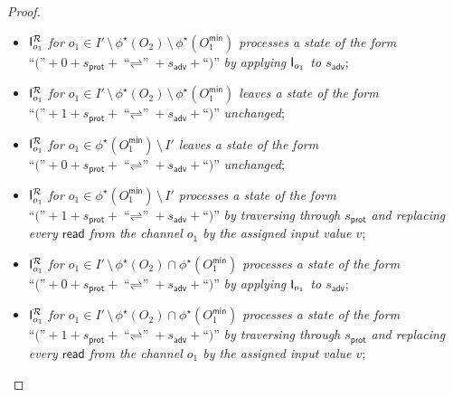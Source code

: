 \begin{proof}
\begin{itemize}
\item $\mathsf{I}_{o_1}^\mathcal{R}$ \emph{for $o_1 \in I' \, \setminus \, \phi^\star(O_2) \, \setminus \, \phi^\star(O_1^\mathsf{min})$ processes a state of the form} $\textsf{``(''} + 0 + s_\mathsf{prot} + \textsf{``$\rightleftharpoons$''} + s_\mathsf{adv} + \textsf{``)''}$ \emph{by applying $\mathsf{I}_{o_1}$ to $s_\mathsf{adv}$};

\item $\mathsf{I}_{o_1}^\mathcal{R}$ \emph{for $o_1 \in I' \, \setminus \, \phi^\star(O_2) \, \setminus \, \phi^\star(O_1^\mathsf{min})$ leaves a state of the form} $\textsf{``(''} + 1 + s_\mathsf{prot} + \textsf{``$\rightleftharpoons$''} + s_\mathsf{adv} + \textsf{``)''}$ \emph{unchanged};

\item $\mathsf{I}_{o_1}^\mathcal{R}$ \emph{for $o_1 \in \phi^\star(O_1^\mathsf{min}) \, \setminus \, I'$ leaves a state of the form} $\textsf{``(''} + 0 + s_\mathsf{prot} + \textsf{``$\rightleftharpoons$''} + s_\mathsf{adv} + \textsf{``)''}$ \emph{unchanged};

\item $\mathsf{I}_{o_1}^\mathcal{R}$ \emph{for $o_1 \in \phi^\star(O_1^\mathsf{min}) \, \setminus \, I'$ processes a state of the form} $\textsf{``(''} + 1 + s_\mathsf{prot} + \textsf{``$\rightleftharpoons$''} + s_\mathsf{adv} + \textsf{``)''}$ \emph{by traversing through $s_\mathsf{prot}$ and replacing every $\mathsf{read}$ from the channel $o_1$ by the assigned input value $v$};

\item $\mathsf{I}_{o_1}^\mathcal{R}$ \emph{for $o_1 \in I' \, \setminus \, \phi^\star(O_2) \cap \phi^\star(O_1^\mathsf{min})$ processes a state of the form} $\textsf{``(''} + 0 + s_\mathsf{prot} + \textsf{``$\rightleftharpoons$''} + s_\mathsf{adv} + \textsf{``)''}$ \emph{by applying $\mathsf{I}_{o_1}$ to $s_\mathsf{adv}$};

\item $\mathsf{I}_{o_1}^\mathcal{R}$ \emph{for $o_1 \in I' \, \setminus \, \phi^\star(O_2) \cap \phi^\star(O_1^\mathsf{min})$ processes a state of the form} $\textsf{``(''} + 1 + s_\mathsf{prot} + \textsf{``$\rightleftharpoons$''} + s_\mathsf{adv} + \textsf{``)''}$ \emph{by traversing through $s_\mathsf{prot}$ and replacing every $\mathsf{read}$ from the channel $o_1$ by the assigned input value $v$};

\end{itemize}




\end{proof}
